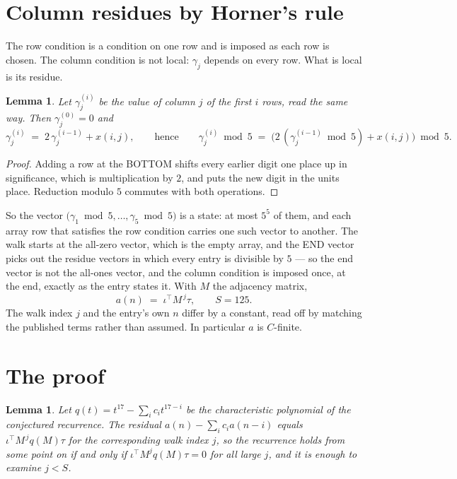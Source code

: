 \documentclass[11pt,a4paper]{article}
\theoremstyle{plain}
\newtheorem{lemma}[theorem]{Lemma}
\theoremstyle{definition}
\begin{document}
\section{Column residues by Horner's rule}

The row condition is a condition on one row and is imposed as each row is chosen. The column
condition is not local: $\gamma_j$ depends on every row. What is local is its residue.

\begin{lemma}\label{lem:horner}
Let $\gamma_j^{(i)}$ be the value of column $j$ of the first $i$ rows, read the same way.
Then $\gamma_j^{(0)}=0$ and
\[
\gamma_j^{(i)}\;=\;2\,\gamma_j^{(i-1)}+x(i,j),
\qquad\text{hence}\qquad
\gamma_j^{(i)}\bmod 5\;=\;
\bigl(2\,(\gamma_j^{(i-1)}\bmod 5)+x(i,j)\bigr)\bmod 5 .
\]
\end{lemma}

\begin{proof}
Adding a row at the BOTTOM shifts every earlier digit one place up in significance, which is
multiplication by $2$, and puts the new digit in the units place. Reduction modulo
$5$ commutes with both operations.
\end{proof}

So the vector $\bigl(\gamma_1\bmod 5,\dots,\gamma_{5}\bmod
5\bigr)$ is a state: at most $5^{5}$ of them, and each array row
that satisfies the row condition carries one such vector to another. The walk starts at the
all-zero vector, which is the empty array, and the END vector picks out the residue vectors in
which every entry is divisible by $5$ --- so the end vector is not the all-ones
vector, and the column condition is imposed once, at the end, exactly as the entry states it.
With $M$ the adjacency matrix,
\[
a(n)\;=\;\iota^{\!\top}M^{\,j}\tau ,\qquad S=125.
\]
The walk index $j$ and the entry's own $n$ differ by a constant, read off by matching the
published terms rather than assumed. In particular $a$ is $C$-finite.

\section{The proof}

\begin{lemma}\label{lem:crit}
Let $q(t)=t^{17}-\sum_i c_it^{17-i}$ be the characteristic polynomial of the
conjectured recurrence. The residual $a(n)-\sum_ic_ia(n-i)$ equals
$\iota^{\!\top}M^{\,j}q(M)\tau$ for the corresponding walk index $j$, so the recurrence
holds from some point on if and only if $\iota^{\!\top}M^{j}q(M)\tau=0$ for all large $j$,
and it is enough to examine $j<S$.
\end{lemma}
\end{document}
